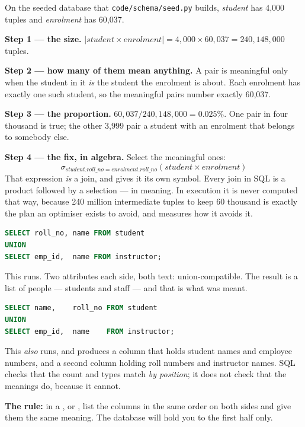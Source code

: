 \begin{worked}
On the seeded database that \texttt{code/schema/seed.py} builds,
\textit{student} has 4{,}000 tuples and \textit{enrolment} has 60{,}037.

\medskip
\textbf{Step 1 --- the size.} $|\mathit{student} \times \mathit{enrolment}|
= 4{,}000 \times 60{,}037 = 240{,}148{,}000$ tuples.

\medskip
\textbf{Step 2 --- how many of them mean anything.} A pair is meaningful only
when the student in it \emph{is} the student the enrolment is about. Each
enrolment has exactly one such student, so the meaningful pairs number exactly
60{,}037.

\medskip
\textbf{Step 3 --- the proportion.} $60{,}037 / 240{,}148{,}000 = 0.025\%$.
One pair in four thousand is true; the other 3{,}999 pair a student with an
enrolment that belongs to somebody else.

\medskip
\textbf{Step 4 --- the fix, in algebra.} Select the meaningful ones:
\[
  \sigma_{\mathit{student.roll\_no} = \mathit{enrolment.roll\_no}}
  (\mathit{student} \times \mathit{enrolment})
\]
That expression \emph{is} a join, and  gives it its own symbol.
Every join in SQL is a product followed by a selection --- in meaning. In
execution it is never computed that way, because 240 million intermediate
tuples to keep 60 thousand is exactly the plan an optimiser exists to avoid,
and  measures how it avoids it.
\end{worked}

\begin{alertbox}
\begin{lstlisting}[language=sql]
SELECT roll_no, name FROM student
UNION
SELECT emp_id,  name FROM instructor;
\end{lstlisting}

This runs. Two attributes each side, both text: union-compatible. The result
is a list of people --- students and staff --- and that is what was meant.

\begin{lstlisting}[language=sql]
SELECT name,    roll_no FROM student
UNION
SELECT emp_id,  name    FROM instructor;
\end{lstlisting}

This \emph{also} runs, and produces a column that holds student names and
employee numbers, and a second column holding roll numbers and instructor
names. SQL checks that the count and types match \emph{by position}; it does
not check that the meanings do, because it cannot.

\smallskip
\textbf{The rule:} in a ,  or ,
list the columns in the same order on both sides and give them the same
meaning. The database will hold you to the first half only.
\end{alertbox}

